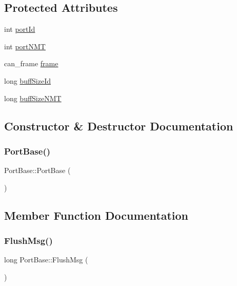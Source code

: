 \subsection*{Protected Attributes}
\begin{DoxyCompactItemize}
\item 
int \hyperlink{classPortBase_af8816a6f73bf391d2948f3564f8ea1df}{port\+Id}
\item 
int \hyperlink{classPortBase_ae63f6df54bbeac1046b5dfbe178e1cee}{port\+N\+MT}
\item 
can\+\_\+frame \hyperlink{classPortBase_ae175156fa18f3be1820adea89ef7b13c}{frame}
\item 
long \hyperlink{classPortBase_a559431268076ea9b23bce545510f7b39}{buff\+Size\+Id}
\item 
long \hyperlink{classPortBase_aba8241e5d55c06c7d1a11ebb18096328}{buff\+Size\+N\+MT}
\end{DoxyCompactItemize}


\subsection{Constructor \& Destructor Documentation}
\mbox{\label{classPortBase_acb7872550bc94538ef95d2510d763be3}} 
\subsubsection{\texorpdfstring{Port\+Base()}{PortBase()}}
{\footnotesize\ttfamily Port\+Base\+::\+Port\+Base (\begin{DoxyParamCaption}{ }\end{DoxyParamCaption})}



\subsection{Member Function Documentation}
\mbox{\label{classPortBase_a913932fc850e9aebc947542773c669ad}} 
\subsubsection{\texorpdfstring{Flush\+Msg()}{FlushMsg()}}
{\footnotesize\ttfamily long Port\+Base\+::\+Flush\+Msg (\begin{DoxyParamCaption}{ }\end{DoxyParamCaption})}


